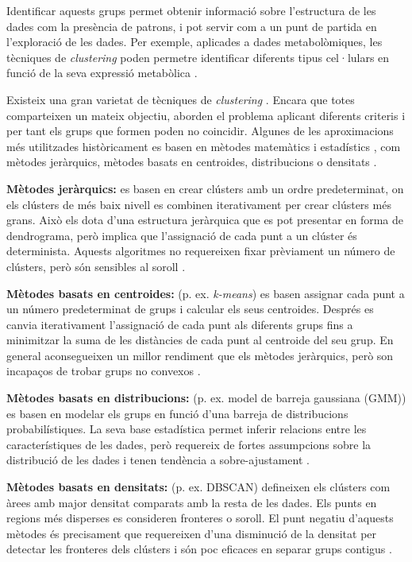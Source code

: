 \documentclass[CAT,BIB]{TFUOC}%
\begin{document}
        Identificar aquests grups permet obtenir informació sobre l'estructura de les dades com la presència de patrons, i pot servir com a un punt de partida en l'exploració de les dades. Per exemple, aplicades a dades metabolòmiques, les tècniques de \textit{clustering} poden permetre identificar diferents tipus cel·lulars en funció de la seva expressió metabòlica \citep{Blekherman2011}.

        Existeix una gran varietat de tècniques de \textit{clustering} \citep{Karim2021, Min2018, Blekherman2011, Masood2015}. Encara que totes comparteixen un mateix objectiu, aborden el problema aplicant diferents criteris i per tant els grups que formen poden no coincidir. Algunes de les aproximacions més utilitzades històricament es basen en mètodes matemàtics i estadístics \citep{Masood2015}, com mètodes jeràrquics, mètodes basats en centroides, distribucions o densitats \citep{Karim2021}.

        \textbf{Mètodes jeràrquics:} es basen en crear clústers amb un ordre predeterminat, on els clústers de més baix nivell es combinen iterativament per crear clústers més grans. Això els dota d'una estructura jeràrquica que es pot presentar en forma de dendrograma, però implica que l'assignació de cada punt a un clúster és determinista. Aquests algoritmes no requereixen fixar prèviament un número de clústers, però són sensibles al soroll \citep{Karim2021}.

        \textbf{Mètodes basats en centroides:} (p. ex. \textit{k-means}) es basen assignar cada punt a un número predeterminat de grups i calcular els seus centroides. Després es canvia iterativament l'assignació de cada punt als diferents grups fins a minimitzar la suma de les distàncies de cada punt al centroide del seu grup. En general aconsegueixen un millor rendiment que els mètodes jeràrquics, però son incapaços de trobar grups no convexos \citep{Karim2021}.

        \textbf{Mètodes basats en distribucions:} (p. ex. model de barreja gaussiana (GMM)) es basen en modelar els grups en funció d'una barreja de distribucions probabilístiques. La seva base estadística permet inferir relacions entre les característiques de les dades, però requereix de fortes assumpcions sobre la distribució de les dades i tenen tendència a sobre-ajustament \citep{Karim2021}.

        \textbf{Mètodes basats en densitats:} (p. ex. DBSCAN) defineixen els clústers com àrees amb major densitat comparats amb la resta de les dades. Els punts en regions més disperses es consideren fronteres o soroll. El punt negatiu d'aquests mètodes és precisament que requereixen d'una disminució de la densitat per detectar les fronteres dels clústers i són poc eficaces en separar grups contigus \citep{Karim2021}.
\end{document}
